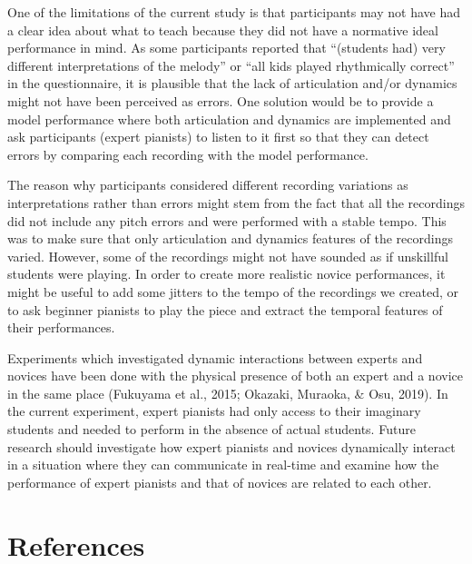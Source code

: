 \documentclass[
  man,floatsintext]{apa6}
\begin{document}
One of the limitations of the current study is that participants may not have had a clear idea about what to teach because they did not have a normative ideal performance in mind. As some participants reported that ``(students had) very different interpretations of the melody'' or ``all kids played rhythmically correct'' in the questionnaire, it is plausible that the lack of articulation and/or dynamics might not have been perceived as errors. One solution would be to provide a model performance where both articulation and dynamics are implemented and ask participants (expert pianists) to listen to it first so that they can detect errors by comparing each recording with the model performance.

The reason why participants considered different recording variations as interpretations rather than errors might stem from the fact that all the recordings did not include any pitch errors and were performed with a stable tempo. This was to make sure that only articulation and dynamics features of the recordings varied. However, some of the recordings might not have sounded as if unskillful students were playing. In order to create more realistic novice performances, it might be useful to add some jitters to the tempo of the recordings we created, or to ask beginner pianists to play the piece and extract the temporal features of their performances.

Experiments which investigated dynamic interactions between experts and novices have been done with the physical presence of both an expert and a novice in the same place (Fukuyama et al., 2015; Okazaki, Muraoka, \& Osu, 2019). In the current experiment, expert pianists had only access to their imaginary students and needed to perform in the absence of actual students. Future research should investigate how expert pianists and novices dynamically interact in a situation where they can communicate in real-time and examine how the performance of expert pianists and that of novices are related to each other.

\clearpage

\hypertarget{references}{%
\section{References}\label{references}}

\begingroup
\setlength{\parindent}{-0in}
\setlength{\leftskip}{0in}
\end{document}
